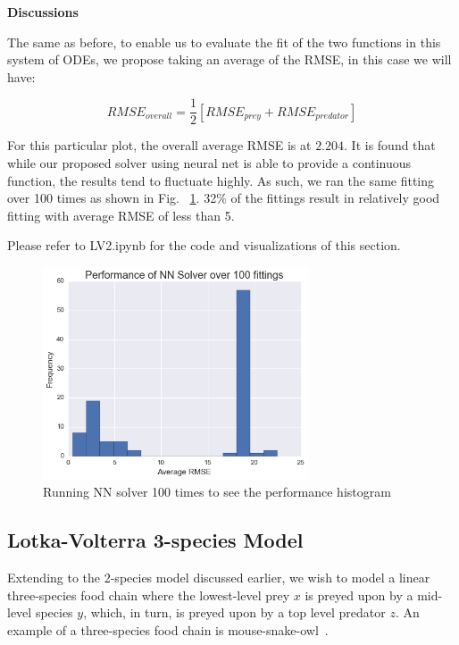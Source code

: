 \documentclass[11pt]{article}
\begin{document}
\textbf{Discussions}

The same as before, to enable us to evaluate the fit of the two functions in this system of ODEs, we propose taking an average of the RMSE, in this case we will have:

\begin{equation}
RMSE_{overall} = \frac{1}{2}[RMSE_{prey} + RMSE_{predator}]
\end{equation}

For this particular plot, the overall average RMSE is at $2.204$. It is found that while our proposed solver using neural net is able to provide a continuous function, the results tend to fluctuate highly. As such, we ran the same fitting over 100 times as shown in Fig. ~\ref{fig:perf_dist}. 32\% of the fittings result in relatively good fitting with average RMSE of less than 5.

Please refer to LV2.ipynb for the code and visualizations of this section.

\begin{figure}
\centering
\includegraphics[width=0.7\textwidth]{perf_distribution.png}
      \caption{Running NN solver 100 times to see the performance histogram \label{fig:perf_dist}}
\end{figure}


\subsection{Lotka-Volterra 3-species Model}
Extending to the 2-species model discussed earlier, we wish to model a linear three-species food chain where the lowest-level prey $x$ is preyed upon by a mid-level species $y$, which, in turn, is preyed upon by a top level predator $z$. An example of a three-species food chain is mouse-snake-owl~\cite{REF3}.  
\end{document}
